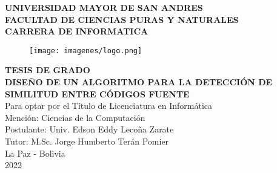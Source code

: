 \begin{titlepage}
    \begin{center}
        {\large \textbf{UNIVERSIDAD MAYOR DE SAN ANDRES}}\\
        \vspace{0.25cm}
        {\large \textbf{FACULTAD DE CIENCIAS PURAS Y NATURALES}}\\
        \vspace{0.25cm}
        {\large \textbf{CARRERA DE INFORMATICA}}\\
        \vspace{0.5cm}
        \begin{figure}[h]
            \centering
            \texttt{[image: imagenes/logo.png]}
        \end{figure}
        \vspace{0.5cm}
        {\large \textbf{TESIS DE GRADO}}\\
        \vspace{0.25cm}
        {\large \textbf{DISEÑO DE UN ALGORITMO PARA LA DETECCIÓN DE SIMILITUD ENTRE CÓDIGOS FUENTE}}\\
        \vspace{0.5cm}
        {\large Para optar por el Título de Licenciatura en Informática}\\
        \vspace{0.25cm}
        {\large Mención: Ciencias de la Computación}\\
        \vspace{0.5cm}
        {\large Postulante: Univ. Edson Eddy Lecoña Zarate}\\
        \vspace{0.25cm}
        {\large Tutor: M.Sc. Jorge Humberto Terán Pomier}\\
        \vspace{0.5cm}
        {\large La Paz - Bolivia}\\
        \vspace{0.25cm}
        {\large 2022}\\
    \end{center}
\end{titlepage}